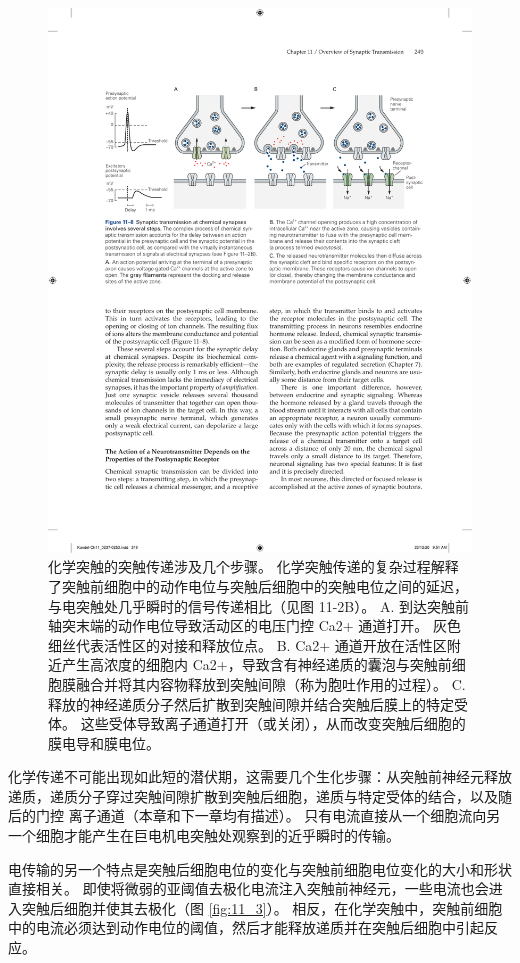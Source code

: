 \begin{figure}[htbp]
	\centering
	\includegraphics[width=0.95\linewidth]{chap11/fig_11_8}
	\caption{化学突触的突触传递涉及几个步骤。 化学突触传递的复杂过程解释了突触前细胞中的动作电位与突触后细胞中的突触电位之间的延迟，与电突触处几乎瞬时的信号传递相比（见图 11-2B）。 A. 到达突触前轴突末端的动作电位导致活动区的电压门控 Ca2+ 通道打开。 灰色细丝代表活性区的对接和释放位点。 B. Ca2+ 通道开放在活性区附近产生高浓度的细胞内 Ca2+，导致含有神经递质的囊泡与突触前细胞膜融合并将其内容物释放到突触间隙（称为胞吐作用的过程）。 C. 释放的神经递质分子然后扩散到突触间隙并结合突触后膜上的特定受体。 这些受体导致离子通道打开（或关闭），从而改变突触后细胞的膜电导和膜电位。}
	\label{fig:11_8}
\end{figure}


化学传递不可能出现如此短的潜伏期，这需要几个生化步骤：从突触前神经元释放递质，递质分子穿过突触间隙扩散到突触后细胞，递质与特定受体的结合，以及随后的门控 离子通道（本章和下一章均有描述）。 
只有电流直接从一个细胞流向另一个细胞才能产生在巨电机电突触处观察到的近乎瞬时的传输。


电传输的另一个特点是突触后细胞电位的变化与突触前细胞电位变化的大小和形状直接相关。 
即使将微弱的亚阈值去极化电流注入突触前神经元，一些电流也会进入突触后细胞并使其去极化（图 \ref{fig:11_3}）。 
相反，在化学突触中，突触前细胞中的电流必须达到动作电位的阈值，然后才能释放递质并在突触后细胞中引起反应。

